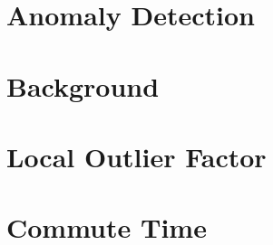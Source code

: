 \section{Anomaly Detection}
\label{anomalyDetection}


\section{Background}
\label{background:background}


\section{Local Outlier Factor}
\label{localOutlierFactor}


\section{Commute Time}
\label{commuteTime}

